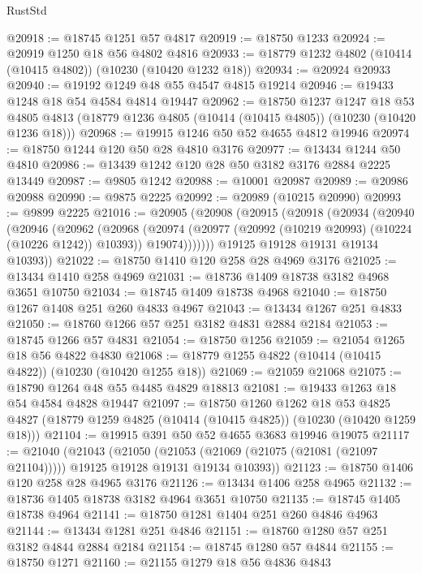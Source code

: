 \begin{lexlean}{RustStd}
\begin{coremodule}
@20918 := @18745 @1251 @57 @4817
@20919 := @18750 @1233
@20924 := @20919 @1250 @18 @56 @4802 @4816
@20933 := @18779 @1232 @4802 (@10414 (@10415 @4802)) (@10230 (@10420 @1232 @18))
@20934 := @20924 @20933
@20940 := @19192 @1249 @48 @55 @4547 @4815 @19214
@20946 := @19433 @1248 @18 @54 @4584 @4814 @19447
@20962 := @18750
    @1237
    @1247
    @18
    @53
    @4805
    @4813
    (@18779 @1236 @4805 (@10414 (@10415 @4805)) (@10230 (@10420 @1236 @18)))
@20968 := @19915 @1246 @50 @52 @4655 @4812 @19946
@20974 := @18750 @1244 @120 @50 @28 @4810 @3176
@20977 := @13434 @1244 @50 @4810
@20986 := @13439 @1242 @120 @28 @50 @3182 @3176 @2884 @2225 @13449
@20987 := @9805 @1242
@20988 := @10001 @20987
@20989 := @20986 @20988
@20990 := @9875 @2225
@20992 := @20989 (@10215 @20990)
@20993 := @9899 @2225
@21016 := @20905
    (@20908
      (@20915
        (@20918
          (@20934
            (@20940
              (@20946
                (@20962
                  (@20968
                    (@20974
                      (@20977 (@20992 (@10219 @20993) (@10224 (@10226 @1242)) @10393))
                      @19074)))))))
        @19125
        @19128
        @19131
        @19134
        @10393))
@21022 := @18750 @1410 @120 @258 @28 @4969 @3176
@21025 := @13434 @1410 @258 @4969
@21031 := @18736 @1409 @18738 @3182 @4968 @3651 @10750
@21034 := @18745 @1409 @18738 @4968
@21040 := @18750 @1267 @1408 @251 @260 @4833 @4967
@21043 := @13434 @1267 @251 @4833
@21050 := @18760 @1266 @57 @251 @3182 @4831 @2884 @2184
@21053 := @18745 @1266 @57 @4831
@21054 := @18750 @1256
@21059 := @21054 @1265 @18 @56 @4822 @4830
@21068 := @18779 @1255 @4822 (@10414 (@10415 @4822)) (@10230 (@10420 @1255 @18))
@21069 := @21059 @21068
@21075 := @18790 @1264 @48 @55 @4485 @4829 @18813
@21081 := @19433 @1263 @18 @54 @4584 @4828 @19447
@21097 := @18750
    @1260
    @1262
    @18
    @53
    @4825
    @4827
    (@18779 @1259 @4825 (@10414 (@10415 @4825)) (@10230 (@10420 @1259 @18)))
@21104 := @19915 @391 @50 @52 @4655 @3683 @19946 @19075
@21117 := @21040
    (@21043
      (@21050
        (@21053 (@21069 (@21075 (@21081 (@21097 @21104)))))
        @19125
        @19128
        @19131
        @19134
        @10393))
@21123 := @18750 @1406 @120 @258 @28 @4965 @3176
@21126 := @13434 @1406 @258 @4965
@21132 := @18736 @1405 @18738 @3182 @4964 @3651 @10750
@21135 := @18745 @1405 @18738 @4964
@21141 := @18750 @1281 @1404 @251 @260 @4846 @4963
@21144 := @13434 @1281 @251 @4846
@21151 := @18760 @1280 @57 @251 @3182 @4844 @2884 @2184
@21154 := @18745 @1280 @57 @4844
@21155 := @18750 @1271
@21160 := @21155 @1279 @18 @56 @4836 @4843

\end{coremodule}
\end{lexlean}
